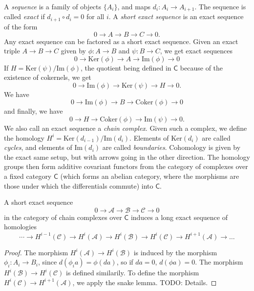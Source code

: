 A \emph{sequence} is a family of objects $\{ A_i \}$, and maps $d_i: A_i \to A_{i+1}$. The sequence is called \emph{exact} if $d_{i+1} \circ d_i = 0$ for all $i$. A \emph{short exact sequence} is an exact sequence of the form
%
\[ 0 \to A \to B \to C \to 0. \]
%
Any exact sequence can be factored as a short exact sequence. Given an exact triple $A \to B \to C$ given by $\phi: A \to B$ and $\psi: B \to C$, we get exact sequences
%
\[ 0 \to \text{Ker}(\phi) \to A \to \text{Im}(\phi) \to 0 \]
%
If $H = \text{Ker}(\psi) / \text{Im}(\phi)$, the quotient being defined in $\mathsf{C}$ because of the existence of cokernels, we get
%
\[ 0 \to \text{Im}(\phi) \to \text{Ker}(\psi) \to H \to 0. \]
%
We have
%
\[ 0 \to \text{Im}(\phi) \to B \to \text{Coker}(\phi) \to 0 \]
%
and finally, we have
%
\[ 0 \to H \to \text{Coker}(\phi) \to \text{Im}(\psi) \to 0. \]
%
We also call an exact sequence a \emph{chain complex}. Given such a complex, we define the homology $H^i = \text{Ker}(d_{i-1}) / \text{Im}(d_i)$. Elements of $\text{Ker}(d_i)$ are called \emph{cycles}, and elements of $\text{Im}(d_i)$ are called \emph{boundaries}. Cohomology is given by the exact same setup, but with arrows going in the other direction. The homology groups then form additive covariant functors from the category of complexes over a fixed category $\mathsf{C}$ (which forms an abelian category, where the morphisms are those under which the differentials commute) into $\mathsf{C}$.

\begin{theorem}
    A short exact sequence
    \[ 0 \to \mathcal{A} \to \mathcal{B} \to \mathcal{C} \to 0 \]
    in the category of chain complexes over $\mathsf{C}$ induces a long exact sequence of homologies
    \[ \cdots \to H^{i-1}(\mathcal{C}) \to H^i(\mathcal{A}) \to H^i(\mathcal{B}) \to H^i(\mathcal{C}) \to H^{i+1}(\mathcal{A}) \to \dots \]
\end{theorem}
\begin{proof}
    The morphism $H^i(\mathcal{A}) \to H^i(\mathcal{B})$ is induced by the morphism $\phi_i: A_i \to B_i$, since $d(\phi_i a) = \phi(da)$, so if $da = 0$, $d(\phi a) = 0$. The morphism $H^i(\mathcal{B}) \to H^i(\mathcal{C})$ is defined similarily. To define the morphism $H^i(\mathcal{C}) \to H^{i+1}(\mathcal{A})$, we apply the snake lemma. TODO: Details.
\end{proof}

